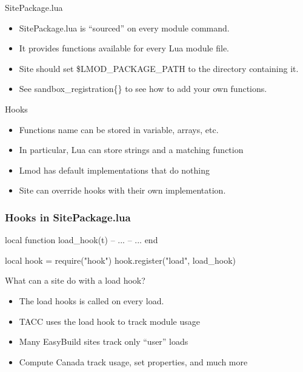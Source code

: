 \documentclass{beamer}
\begin{document}
\begin{frame}{SitePackage.lua}
  \begin{itemize}
    \item SitePackage.lua is ``sourced'' on every module command.
    \item It provides functions available for every Lua module file.
    \item Site should set \$LMOD\_PACKAGE\_PATH to the directory
      containing it.
    \item See sandbox\_registration\{\} to see how to add your own functions.
  \end{itemize}
\end{frame}

\begin{frame}{Hooks}
  \begin{itemize}
    \item Functions name can be stored in variable, arrays, etc.
    \item In particular, Lua can store strings and a matching function
    \item Lmod has default implementations that do nothing
    \item Site can override hooks with their own implementation.
  \end{itemize}
\end{frame}

\begin{frame}[fragile]
  \frametitle{Hooks in SitePackage.lua}
    {\small
\begin{semiverbatim}
local function load_hook(t)
   -- ...
   -- ...
end

local hook = require("hook")
hook.register("load", load_hook)
\end{semiverbatim}
    }
\end{frame}


\begin{frame}{What can a site do with a load hook?}
  \begin{itemize}
    \item The load hooks is called on every load.
    \item TACC uses the load hook to track module usage
    \item Many EasyBuild sites track only ``user'' loads 
    \item Compute Canada track usage, set properties, and much more
  \end{itemize}
\end{frame}
\end{document}
